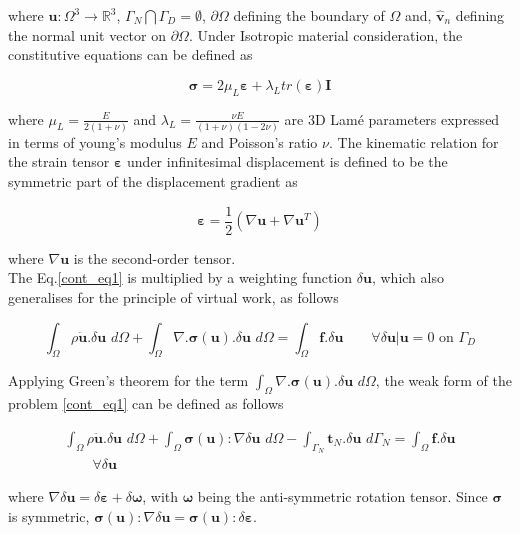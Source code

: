 where $\bm{u}:\Omega^3 \rightarrow \mathbb{R}^3$, $\Gamma_{N} \bigcap \Gamma_{D} = \emptyset$, $\partial\Omega$ defining the boundary of $\Omega$ and, $\bm{\hat{v}}_n$ defining the normal unit vector on $\partial\Omega$. Under Isotropic material consideration, the constitutive equations  can be defined as 

\begin{equation}
\bm{\sigma}=2\mu_L\bm{\varepsilon}+\lambda_L tr(\bm{\varepsilon})\bm{I}
\end{equation}

where $\mu_L = \frac{E}{2(1+\nu)}$ and $\lambda_L=\frac{\nu E}{(1+\nu)(1-2\nu)}$ are 3D Lamé parameters expressed in terms of young's modulus $E$ and Poisson's ratio $\nu$. The kinematic relation for the strain tensor $\bm{\varepsilon}$ under infinitesimal displacement is defined to be the symmetric part of the displacement gradient as 

\begin{equation}
\bm{\varepsilon}=\frac{1}{2}(\nabla\bm{u}+\nabla\bm{u}^T)
\end{equation}

where $\nabla\bm{u}$ is the second-order tensor. \\

The Eq.\eqref{cont_eq1} is multiplied by a weighting function $\delta \bm{u}$, which also generalises for the principle of virtual work, as follows

\begin{equation}
   \int_{\Omega}\rho\bm{\ddot{u}}.\delta \bm{u} \,\, d\Omega+\int_{\Omega}  \nabla\bm{.}\bm{\sigma}(\bm{u}).\delta \bm{u} \,\,d\Omega=   \int_{\Omega} \bm{f}.\delta \bm{u} \qquad \forall \delta \bm{u}|\bm{u}=0\,\, \mathrm{on} \,\, \Gamma_D \label{cont2}
\end{equation}

Applying Green's theorem for the term $\int_{\Omega}  \nabla\bm{.}\bm{\sigma}(\bm{u}).\delta \bm{u} \,\,d\Omega$, the weak form of the problem \eqref{cont_eq1} can be defined as follows

\begin{multline}
   \int_{\Omega}\rho\bm{\ddot{u}}.\delta \bm{u} \,\, d\Omega+\int_{\Omega}  \bm{\sigma}(\bm{u}):\nabla\delta \bm{u} \,\,d\Omega - \int_{\Gamma_{N}}\bm{t}_{N}.\delta \bm{u}\,\,d\Gamma_{N} =\int_{\Omega} \bm{f}.\delta \bm{u} \\ \qquad \forall \delta \bm{u}  \label{weak_f}
\end{multline}

where $\nabla\delta\bm{u}=\delta\bm{\varepsilon}+\delta\bm\omega$, with $\bm\omega$ being the anti-symmetric rotation tensor. Since $\bm{\sigma}$ is symmetric, $\bm{\sigma}(\bm{u}):\nabla\delta \bm{u} = \bm{\sigma}(\bm{u}):\delta\bm\varepsilon$. \\


